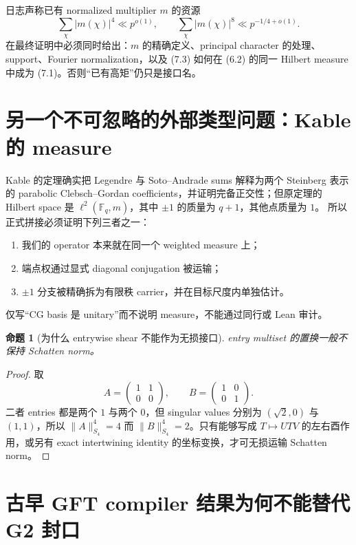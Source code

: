\documentclass[11pt,a4paper]{ctexart}
\newtheorem{proposition}[theorem]{命题}
\theoremstyle{definition}
\newcommand{\F}{\mathbb F}
\newcommand{\1}{\mathbf 1}
\begin{document}
日志声称已有 normalized multiplier $m$ 的资源
\[
\sum_\chi|m(\chi)|^4\ll p^{o(1)},
\qquad
\sum_\chi|m(\chi)|^8\ll p^{-1/4+o(1)}.
\tag{7.3}
\]
在最终证明中必须同时给出：$m$ 的精确定义、principal character 的处理、
support、Fourier normalization，以及 (7.3) 如何在 (6.2) 的同一 Hilbert
measure 中成为 (7.1)。否则“已有高矩”仍只是接口名。

\section{另一个不可忽略的外部类型问题：Kable 的 measure}

Kable 的定理确实把 Legendre 与 Soto--Andrade sums 解释为两个 Steinberg
表示的 parabolic Clebsch--Gordan coefficients，并证明完备正交性；但原定理的
Hilbert space 是 $\ell^2(\F_q,m)$，其中 $\pm1$ 的质量为 $q+1$，其他点质量为 $1$。
所以正式拼接必须证明下列三者之一：
\begin{enumerate}
\item 我们的 operator 本来就在同一个 weighted measure 上；
\item 端点权通过显式 diagonal conjugation 被运输；
\item $\pm1$ 分支被精确拆为有限秩 carrier，并在目标尺度内单独估计。
\end{enumerate}
仅写“CG basis 是 unitary”而不说明 measure，不能通过同行或 Lean 审计。

\begin{proposition}[为什么 entrywise shear 不能作为无损接口]
entry multiset 的置换一般不保持 Schatten norm。
\end{proposition}

\begin{proof}
取
\[
A=\begin{pmatrix}1&1\\0&0\end{pmatrix},\qquad
B=\begin{pmatrix}1&0\\0&1\end{pmatrix}.
\]
二者 entries 都是两个 $1$ 与两个 $0$，但 singular values 分别为
$(\sqrt2,0)$ 与 $(1,1)$，所以 $\|A\|_{S_4}^4=4$ 而
$\|B\|_{S_4}^4=2$。只有能够写成 $T\mapsto UTV$ 的左右酉作用，或另有
exact intertwining identity 的坐标变换，才可无损运输 Schatten norm。
\end{proof}

\section{古早 GFT compiler 结果为何不能替代 G2 封口}
\end{document}
